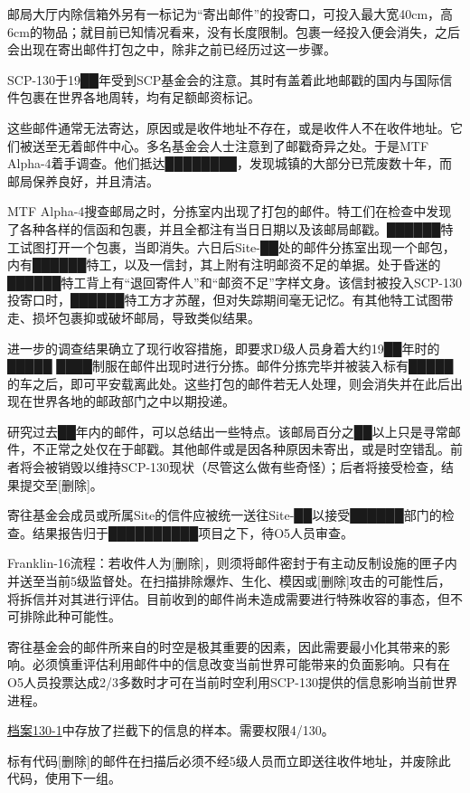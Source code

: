 邮局大厅内除信箱外另有一标记为“寄出邮件”的投寄口，可投入最大宽40cm，高6cm的物品；就目前已知情况看来，没有长度限制。包裹一经投入便会消失，之后会出现在寄出邮件打包之中，除非之前已经历过这一步骤。

SCP-130于19██年受到SCP基金会的注意。其时有盖着此地邮戳的国内与国际信件包裹在世界各地周转，均有足额邮资标记。

这些邮件通常无法寄达，原因或是收件地址不存在，或是收件人不在收件地址。它们被送至无着邮件中心。多名基金会人士注意到了邮戳奇异之处。于是MTF Alpha-4着手调查。他们抵达████████，发现城镇的大部分已荒废数十年，而邮局保养良好，并且清洁。

MTF Alpha-4搜查邮局之时，分拣室内出现了打包的邮件。特工们在检查中发现了各种各样的信函和包裹，并且全都注有当日日期以及该邮局邮戳。██████特工试图打开一个包裹，当即消失。六日后Site-██处的邮件分拣室出现一个邮包，内有██████特工，以及一信封，其上附有注明邮资不足的单据。处于昏迷的██████特工背上有“退回寄件人”和“邮资不足”字样文身。该信封被投入SCP-130投寄口时，██████特工方才苏醒，但对失踪期间毫无记忆。有其他特工试图带走、损坏包裹抑或破坏邮局，导致类似结果。

进一步的调查结果确立了现行收容措施，即要求D级人员身着大约19██年时的█████ ████制服在邮件出现时进行分拣。邮件分拣完毕并被装入标有█████的车之后，即可平安载离此处。这些打包的邮件若无人处理，则会消失并在此后出现在世界各地的邮政部门之中以期投递。

研究过去██年内的邮件，可以总结出一些特点。该邮局百分之██以上只是寻常邮件，不正常之处仅在于邮戳。其他邮件或是因各种原因未寄出，或是时空错乱。前者将会被销毁以维持SCP-130现状（尽管这么做有些奇怪）；后者将接受检查，结果提交至{[}删除]。

寄往基金会成员或所属Site的信件应被统一送往Site-██以接受██████部门的检查。结果报告归于██████████项目之下，待O5人员审查。

Franklin-16流程：若收件人为{[}删除]，则须将邮件密封于有主动反制设施的匣子内并送至当前5级监督处。在扫描排除爆炸、生化、模因或{[}删除]攻击的可能性后，将拆信并对其进行评估。目前收到的邮件尚未造成需要进行特殊收容的事态，但不可排除此种可能性。

寄往基金会的邮件所来自的时空是极其重要的因素，因此需要最小化其带来的影响。必须慎重评估利用邮件中的信息改变当前世界可能带来的负面影响。只有在O5人员投票达成2\slash 3多数时才可在当前时空利用SCP-130提供的信息影响当前世界进程。

\hyperref[sec:DOC-document-130-1]{档案130-1}中存放了拦截下的信息的样本。需要权限4\slash 130。

标有代码{[}删除]的邮件在扫描后必须不经5级人员而立即送往收件地址，并废除此代码，使用下一组。

